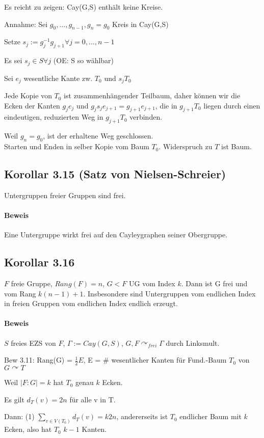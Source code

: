 \documentclass{article}
\begin{document}
Es reicht zu zeigen: Cay(G,S) enthält keine Kreise.

Annahme: Sei $g_0,\ldots, g_{n-1}, g_n = g_0$ Kreis in Cay(G,S)

Setze $s_j := g_j^{-1}g_{j+1} \forall j= 0, \ldots , n-1$

Es sei $s_j\in S \forall j$ (OE: S so wählbar)

Sei $e_j$ wesentliche Kante zw. $T_0$ und $s_jT_0$

Jede Kopie von $T_0$ ist zusammenhängender Teilbaum, daher können wir die Ecken der Kanten $g_je_j$ und $g_js_je_{j+1} = g_{j+1}e_{j+1}$, die in $g_{j+1}T_0$ liegen durch einen eindeutigen, reduzierten Weg in $g_{j+1}T_0$ verbinden.

Weil $g_n = g_0$, ist der erhaltene Weg geschlossen.\\
Starten und Enden in selber Kopie vom Baum $T_0$. Widerspruch zu $T$ ist Baum.

\subsection{Korollar 3.15 (Satz von Nielsen-Schreier)} Untergruppen freier Gruppen sind frei.
\paragraph{Beweis} Eine Untergruppe wirkt frei auf den Cayleygraphen seiner Obergruppe.

\subsection{Korollar 3.16} $F$ freie Gruppe, $Rang(F) = n$, $G < F$ UG vom Index $k$. Dann ist G frei und vom Rang $k(n-1) + 1$. Insbesondere sind Untergruppen vom endlichen Index in freien Gruppen vom endlichen Index endlich erzeugt.
\paragraph{Beweis} $S$ freies EZS von $F$, $\Gamma:= Cay(G,S)$, $G,F \curvearrowright_{frei} \Gamma$ durch Linksmult.

Bew 3.11: Rang(G) = $\frac{1}{2} E$, E = \# wesentlicher Kanten für Fund.-Baum $T_0$ von $G \curvearrowright T$

Weil $|F:G| = k$ hat $T_0$ genau $k$ Ecken.

Es gilt $d_T(v) = 2n$ für alle v in T.

Dann: (1) $\sum_{v\in V(T_0)} d_T(v) = k 2n$, andererseits ist $T_0$ endlicher Baum mit $k$ Ecken, also hat $T_0$ $k-1$ Kanten.
\end{document}

